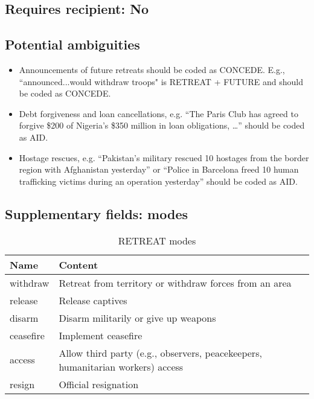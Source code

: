 \documentclass[11pt]{report}
\newcommand{\plcat}[1]{\textsf{#1}}
\begin{document}
\subsection{Requires recipient: No}

\subsection{Potential ambiguities}

\begin{itemize}
\item Announcements of future retreats should be coded as \plcat{CONCEDE}. E.g., ``announced...would withdraw troops" is \plcat{RETREAT} + \plcat{FUTURE} and should be coded as \plcat{CONCEDE}.
\item Debt forgiveness and loan cancellations, e.g. ``The Paris Club has agreed to forgive \$200 of Nigeria’s \$350 million in loan obligations, \dots'' should be coded as \plcat{AID}.
\item Hostage rescues, e.g. ``Pakistan’s military rescued 10 hostages from the border region with Afghanistan yesterday'' or ``Police in Barcelona freed 10 human trafficking victims during an operation yesterday'' should be coded as \plcat{AID}.
\end{itemize}

\subsection{Supplementary fields: modes}

\begin{table}[htp]
\caption{RETREAT modes}
\begin{center}
\begin{tabular}{|l|p{13cm}|}
\hline
Name & Content \\
\hline
withdraw & Retreat from territory or withdraw forces from an area\\
release & Release captives \\
disarm & Disarm militarily or give up weapons\\
ceasefire & Implement ceasefire\\
access & Allow third party (e.g., observers, peacekeepers, humanitarian workers) access \\
resign & Official resignation \\
\hline
\end{tabular}
\end{center}
\label{tab:retreatmode}
\end{table}%
\end{document}
